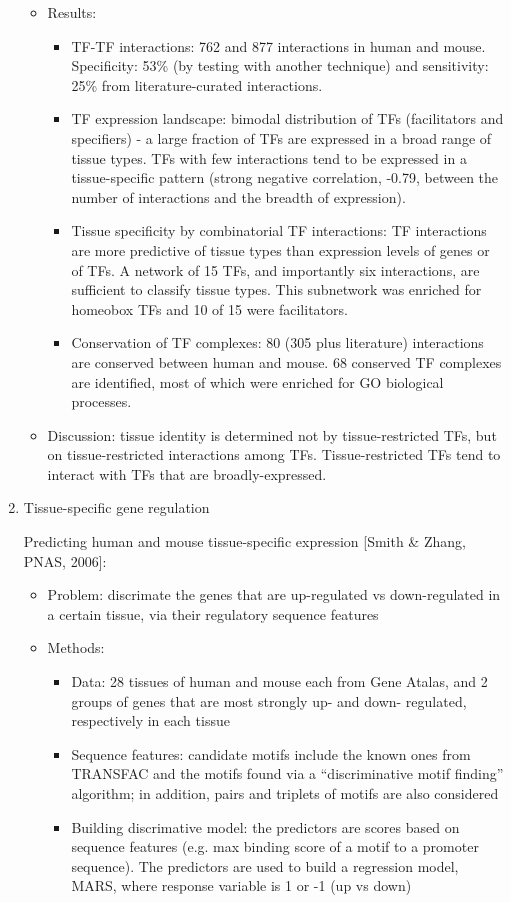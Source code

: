 \documentclass{report}
\begin{document}
\begin{enumerate}
\begin{itemize}
		\item Results: 
		\begin{itemize}
			\item TF-TF interactions: 762 and 877 interactions in human and mouse. Specificity: 53\% (by testing with another technique) and sensitivity: 25\% from literature-curated interactions. 
			\item TF expression landscape: bimodal distribution of TFs (facilitators and specifiers) - a large fraction of TFs are expressed in a broad range of tissue types. TFs with few interactions tend to be expressed in a tissue-specific pattern (strong negative correlation, -0.79, between the number of interactions and the breadth of expression). 
			\item Tissue specificity by combinatorial TF interactions: TF interactions are more predictive of tissue types than expression levels of genes or of TFs. A network of 15 TFs, and importantly six interactions, are sufficient to classify tissue types. This subnetwork was enriched for homeobox TFs and 10 of 15 were facilitators. 
			\item Conservation of TF complexes: 80 (305 plus literature) interactions are conserved between human and mouse. 68 conserved TF complexes are identified, most of which were enriched for GO biological processes. 
		\end{itemize}
		
		\item Discussion: tissue identity is determined not by tissue-restricted TFs, but on tissue-restricted interactions among TFs. Tissue-restricted TFs tend to interact with TFs that are broadly-expressed. 
	\end{itemize}
	
	\item{Tissue-specific gene regulation}
	
	Predicting human and mouse tissue-specific expression [Smith \& Zhang, PNAS, 2006]:
	\begin{itemize}
		\item Problem: discrimate the genes that are up-regulated vs down-regulated in a certain tissue, via their regulatory sequence features
		
		\item Methods:
		\begin{itemize}
			\item Data: 28 tissues of human and mouse each from Gene Atalas, and 2 groups of genes that are most strongly up- and down- regulated, respectively in each tissue
			\item Sequence features: candidate motifs include the known ones from TRANSFAC and the motifs found via a ``discriminative motif finding'' algorithm; in addition, pairs and triplets of motifs are also considered
			\item Building discrimative model: the predictors are scores based on sequence features (e.g. max binding score of a motif to a promoter sequence). The predictors are used to build a regression model, MARS, where response variable is 1 or -1 (up vs down)
		\end{itemize}
	\end{itemize}
	

\end{enumerate}
\end{document}
